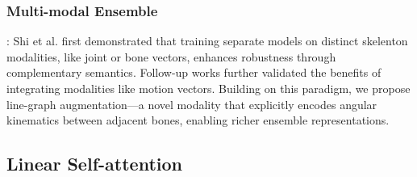 
\subsubsection{Multi-modal Ensemble}: Shi et al. \cite{ref13} first 
demonstrated that training separate models on distinct skelenton
modalities, like joint or bone vectors, enhances robustness 
through complementary semantics. Follow-up works \cite{ref9,ref11,ref12} 
further validated the benefits of integrating modalities like motion 
vectors. Building on this paradigm, we propose line-graph 
augmentation—a novel modality that explicitly encodes angular 
kinematics between adjacent bones, enabling richer ensemble representations.

\subsection{Linear Self-attention}
